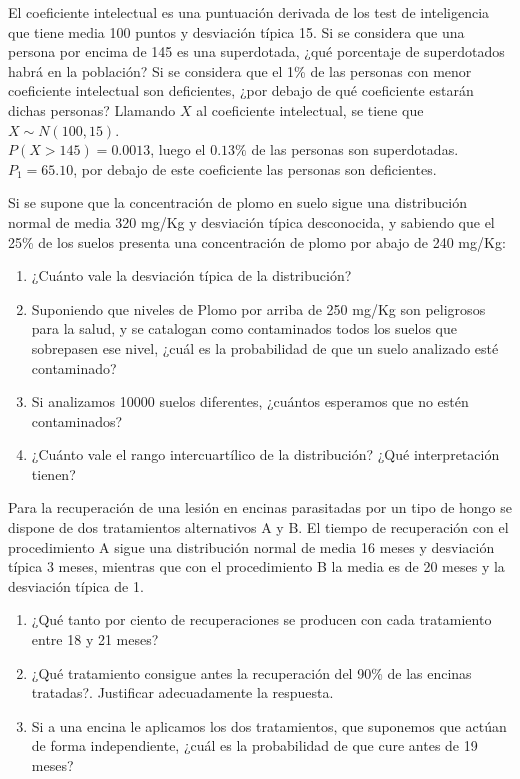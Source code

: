 {El coeficiente intelectual es una puntuación derivada de los test de inteligencia que tiene media 100 puntos y
desviación típica 15.
Si se considera que una persona por encima de 145 es una superdotada, ¿qué porcentaje de superdotados habrá en la
población?
Si se considera que el 1\% de las personas con menor coeficiente intelectual son deficientes, ¿por debajo de qué
coeficiente estarán dichas personas? }
{Llamando $X$ al coeficiente intelectual, se tiene que $X\sim N(100,15)$.\\
$P(X>145)=0.0013$, luego el $0.13\%$ de las personas son superdotadas.\\
$P_1=65.10$, por debajo de este coeficiente las personas son deficientes.}
{}


{Si se supone que la concentración de plomo en suelo sigue una distribución normal de media 320 mg/Kg y desviación típica desconocida, y sabiendo que el 25\% de los suelos presenta una concentración de plomo por abajo de 240 mg/Kg:
\begin{enumerate}
\item ¿Cuánto vale la desviación típica de la distribución?
\item Suponiendo que niveles de Plomo por arriba de 250 mg/Kg son peligrosos para la salud, y se catalogan como contaminados todos los suelos que sobrepasen ese nivel, ¿cuál es la probabilidad de que un suelo analizado esté contaminado?
\item Si analizamos 10000 suelos diferentes, ¿cuántos esperamos que no estén contaminados?
\item ¿Cuánto vale el rango intercuartílico de la distribución? ¿Qué interpretación tienen?
\end{enumerate}
}
{}
{}


{Para la recuperación de una lesión en encinas parasitadas por un tipo de hongo se dispone de dos tratamientos alternativos A y B. El tiempo de recuperación con el procedimiento A sigue una distribución normal de media 16 meses y desviación típica 3 meses, mientras que con el procedimiento B la media es de 20 meses y la desviación típica de 1.
\begin{enumerate}
\item ¿Qué tanto por ciento de recuperaciones se producen con cada tratamiento entre 18 y 21 meses?
\item ¿Qué tratamiento consigue antes la recuperación del 90\% de las encinas tratadas?. Justificar adecuadamente la respuesta.
\item Si a una encina le aplicamos los dos tratamientos, que suponemos que actúan de forma independiente, ¿cuál es la
probabilidad de que cure antes de 19 meses?
\end{enumerate}
}
{}
{}


